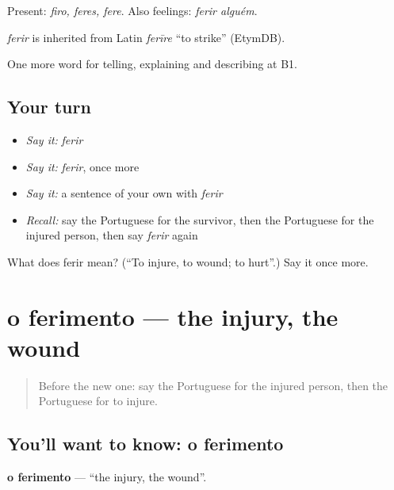 Present: \emph{firo, feres, fere}. Also feelings: \emph{ferir alguém}.

\begin{cousinweb}
\emph{ferir} is inherited from Latin \emph{ferīre} \textquotedblleft{}to strike\textquotedblright{} (EtymDB).
\end{cousinweb}

\begin{grammarlens}[title={What you've built}]
One more word for telling, explaining and describing at B1.
\end{grammarlens}

\subsection*{Your turn}
\begin{itemize}
\raggedright
  \item \emph{Say it:} \emph{ferir}
  \item \emph{Say it:} \emph{ferir}, once more
  \item \emph{Say it:} a sentence of your own with \emph{ferir}
  \item \emph{Recall:} say the Portuguese for the survivor, then the Portuguese for the injured person, then say \emph{ferir} again
\end{itemize}

\begin{tcolorbox}[breakable,colback=teal!4,colframe=teal!35!black,title={Before you move on}]
What does ferir mean? (\textquotedblleft{}To injure, to wound; to hurt\textquotedblright{}.) Say it once more.
\end{tcolorbox}
\section[o ferimento]{o ferimento — the injury, the wound}

\label{lesson:PT-C307-ferimento}



\begin{quote}
Before the new one: say the Portuguese for the injured person, then the Portuguese for to injure.
\end{quote}

\subsection*{You'll want to know: o ferimento}
\textbf{o ferimento} — \textquotedblleft{}the injury, the wound\textquotedblright{}.

